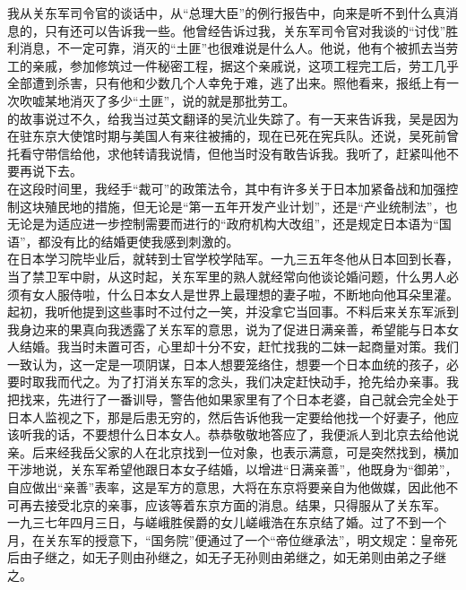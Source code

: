 我从关东军司令官的谈话中，从“总理大臣”的例行报告中，向来是听不到什么真消息的，只有还可以告诉我一些。他曾经告诉过我，关东军司令官对我谈的“讨伐”胜利消息，不一定可靠，消灭的“土匪”也很难说是什么人。他说，他有个被抓去当劳工的亲戚，参加修筑过一件秘密工程，据这个亲戚说，这项工程完工后，劳工几乎全部遭到杀害，只有他和少数几个人幸免于难，逃了出来。照他看来，报纸上有一次吹嘘某地消灭了多少“土匪”，说的就是那批劳工。\\

的故事说过不久，给我当过英文翻译的吴沆业失踪了。有一天来告诉我，吴是因为在驻东京大使馆时期与美国人有来往被捕的，现在已死在宪兵队。还说，吴死前曾托看守带信给他，求他转请我说情，但他当时没有敢告诉我。我听了，赶紧叫他不要再说下去。\\

在这段时间里，我经手“裁可”的政策法令，其中有许多关于日本加紧备战和加强控制这块殖民地的措施，但无论是“第一五年开发产业计划”，还是“产业统制法”，也无论是为适应进一步控制需要而进行的“政府机构大改组”，还是规定日本语为“国语”，都没有比的结婚更使我感到刺激的。\\

在日本学习院毕业后，就转到士官学校学陆军。一九三五年冬他从日本回到长春，当了禁卫军中尉，从这时起，关东军里的熟人就经常向他谈论婚问题，什么男人必须有女人服侍啦，什么日本女人是世界上最理想的妻子啦，不断地向他耳朵里灌。起初，我听他提到这些事时不过付之一笑，并没拿它当回事。不料后来关东军派到我身边来的果真向我透露了关东军的意思，说为了促进日满亲善，希望能与日本女人结婚。我当时未置可否，心里却十分不安，赶忙找我的二妹一起商量对策。我们一致认为，这一定是一项阴谋，日本人想要笼络住，想要一个日本血统的孩子，必要时取我而代之。为了打消关东军的念头，我们决定赶快动手，抢先给办亲事。我把找来，先进行了一番训导，警告他如果家里有了个日本老婆，自己就会完全处于日本人监视之下，那是后患无穷的，然后告诉他我一定要给他找一个好妻子，他应该听我的话，不要想什么日本女人。恭恭敬敬地答应了，我便派人到北京去给他说亲。后来经我岳父家的人在北京找到一位对象，也表示满意，可是突然找到，横加干涉地说，关东军希望他跟日本女子结婚，以增进“日满亲善”，他既身为“御弟”，自应做出“亲善”表率，这是军方的意思，大将在东京将要亲自为他做媒，因此他不可再去接受北京的亲事，应该等着东京方面的消息。结果，只得服从了关东军。\\

一九三七年四月三日，与嵯峨胜侯爵的女儿嵯峨浩在东京结了婚。过了不到一个月，在关东军的授意下，“国务院”便通过了一个“帝位继承法”，明文规定：皇帝死后由子继之，如无子则由孙继之，如无子无孙则由弟继之，如无弟则由弟之子继之。\\


